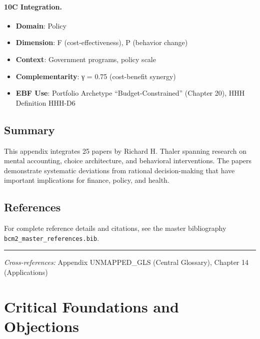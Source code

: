 \paragraph{10C Integration.}
\begin{itemize}[nosep]
  \item \textbf{Domain}: Policy
  \item \textbf{Dimension}: F (cost-effectiveness), P (behavior change)
  \item \textbf{Context}: Government programs, policy scale
  \item \textbf{Complementarity}: γ = 0.75 (cost-benefit synergy)
  \item \textbf{EBF Use}: Portfolio Archetype ``Budget-Constrained'' (Chapter 20), HHH Definition HHH-D6
\end{itemize}

\subsection{Summary}

This appendix integrates 25 papers by Richard H. Thaler
spanning research on mental accounting, choice architecture, and behavioral
interventions. The papers demonstrate systematic deviations from rational
decision-making that have important implications for finance, policy, and health.

\subsection{References}

For complete reference details and citations, see the master bibliography
\texttt{bcm2\_master\_references.bib}.

\vspace{1em}
\hrule
\vspace{0.5em}

\noindent\textit{Cross-references:}
Appendix UNMAPPED_GLS (Central Glossary), Chapter 14 (Applications)



\section{Critical Foundations and Objections}
\label{sec:thl-foundations}


